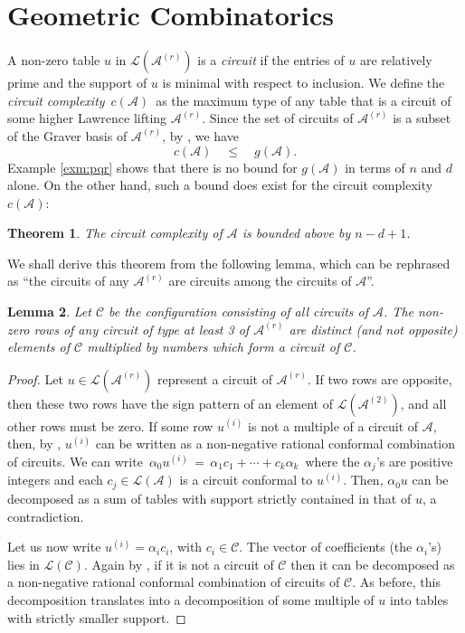 \documentclass[11pt]{amsart}
\newtheorem{theorem}{Theorem}
\newtheorem{lemma}[theorem]{Lemma}
\theoremstyle{definition}
\newcommand{\C}{{\mathcal C}}
\renewcommand{\L}{{\mathcal L}}
\newcommand{\A}{{\mathcal A}}
\begin{document}
  \section{\bf Geometric Combinatorics}
  \label{sec:geometriccombinatorics}

A non-zero table $u$ in $\L(\A^{(r)})$ is a {\em circuit}
if the entries of $u$ are relatively prime and
the support of $u$ is minimal with respect to inclusion.
We define the {\em circuit complexity} $\, c(\A)\,$ as the maximum type
of any table that is a circuit of some
higher Lawrence lifting $\A^{(r)}$.
Since the set of circuits of $\A^{(r)}$ is a subset of the
Graver basis of $\A^{(r)}$, by
  \cite[Proposition 4.11]{Sturmfels-book}, we have
$$ c(\A) \quad \leq \quad g(\A) . $$
Example  \ref{exm:pqr} shows that there is no bound for
$g(\A)$ in terms of $n$ and $d$ alone.
On the other hand, such a bound does exist for
the circuit complexity $c(\A)$:

\begin{theorem}
\label{thm:circuits}
The circuit complexity of $\A$ is bounded above by $n-d+1$.
\end{theorem}

We shall derive this theorem from the following lemma, which can be  
rephrased as
``the circuits of any $\A^{(r)}$ are circuits among the circuits of  
$\A$''.

\begin{lemma}
\label{discirc}
Let $\C$ be the configuration consisting of all circuits of $\A$.
The non-zero rows of any circuit of type at least 3 of $\A^{(r)}$
are distinct (and not opposite) elements of $\C$ multiplied by
numbers which form a circuit of $\C$.
\end{lemma}

\begin{proof}
Let $u\in\L(\A^{(r)})$ represent a circuit of $\A^{(r)}$.
If two rows are opposite, then these two rows have the
sign pattern of an element of $\L(\A^{(2)})$,
and all other rows must be zero.
If some row $u^{(i)}$ is not a multiple of a circuit of $\A$,
then, by \cite[Lemma 4.10]{Sturmfels-book}, $u^{(i)}$ can be written
as  a non-negative rational conformal combination of circuits.
We can write
  $\,\alpha_0 u^{(i)} \,=\, \alpha_1 c_1 + \cdots + c_k  \alpha_k\,$
where the $\alpha_j$'s are positive integers and each $c_j\in\L(\A)$
is a circuit conformal to $u^{(i)}$. Then,
$\alpha_0 u$ can be decomposed as a sum of tables with support
strictly contained in that of $u$, a contradiction.

Let us now write  $u^{(i)}=\alpha_i c_i$, with $c_i\in\C$.
The vector of coefficients (the $\alpha_i$'s)
lies in $\L(\C)$. Again by \cite[Lemma 4.10]{Sturmfels-book}, if it is  
not a circuit of $\C$ then it
can be decomposed as a
non-negative rational conformal combination of circuits of $\C$.
As before, this decomposition
translates into a decomposition of some multiple of $u$ into tables
with strictly smaller support.
\end{proof}
\end{document}

